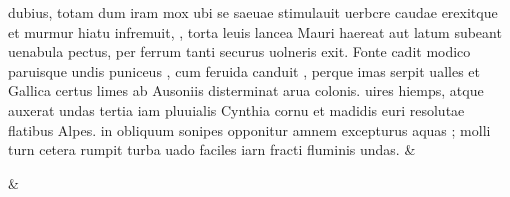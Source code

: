 \documentclass[12pt, a4paper]{report} ﻿
\begin{document}
             dubius, totam dum  iram
            mox ubi se saeuae stimulauit uerbcre caudae
            erexitque  et 
                murmur hiatu
            infremuit, , torta leuis  lancea Mauri
            haereat aut latum subeant uenabula pectus,
            per ferrum tanti securus uolneris exit.
            Fonte cadit modico paruisque  undis
            puniceus , cum feruida canduit ,
            perque imas serpit ualles et Gallica certus
            limes ab Ausoniis disterminat arua colonis.
             uires  hiemps, atque auxerat undas
            tertia iam  pluuialis Cynthia cornu
            et madidis euri resolutae flatibus Alpes.
             in obliquum sonipes opponitur amnem
            excepturus aquas ; molli turn cetera rumpit
            turba uado faciles iarn fracti fluminis undas.
          &  

            \& 
         \endnumbering 
\end{document}

